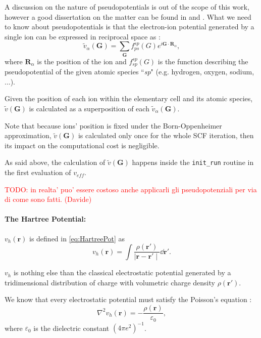 \documentclass[a4paper,12pt]{article}
\newcommand\mynotes[1]{\begin{flushright}

\textcolor{red}{TODO: #1}\end{flushright}}
\newcommand\mf[1]{\mathbf{#1}}
\newcommand\dens{\rho(\mathbf{r})}
\newcommand\erre{\mathbf{r}}
\newcommand\GI{\mathbf{G}}
\begin{document}
A discussion on the nature of pseudopotentials is out of the scope of this work, however a good dissertation on the matter can be found in \cite[chap. 11]{Martin} and \cite[p.90]{Marx}.
What we need to know about pseudopotentials is that the electron-ion potential generated by a single ion can be expressed in reciprocal space as :
\begin{equation}
	\tilde{v}_{\alpha}(\mf{G}) = \sum_{\mf{G}} f_{ps}^{sp}(G) e^{i \mf{G} \cdot \mf{R}_{\alpha}},
\end{equation}
where  $\mf{R}_{\alpha}$ is the position of the ion and $f_{sp}^{sp}(G)$ is the function describing the pseudopotential of the given atomic species ``\textit{sp}" (e.g. hydrogen, oxygen, sodium, ...).

Given the position of each ion within the elementary cell and its atomic species, $\tilde{v}(\mf{G})$ is calculated as a superposition of each $\tilde{v}_{\alpha}(\mf{G})$.

Note that because ions' position is fixed under the Born-Oppenheimer approximation, $\tilde{v}(\mf{G})$ is calculated only once for the whole SCF iteration, then its impact on the computational cost is negligible.  

As said above, the calculation of $\tilde{v}(\GI)$ happens inside the \texttt{init\_run} routine in the first evaluation of $v_{eff}$.

\mynotes{in realta' puo' essere costoso anche applicarli gli pseudopotenziali per via di come sono fatti. (Davide)}

\paragraph{The Hartree Potential:}

$v_{h}(\erre)$ is defined in \eqref{eq:HartreePot} as 
\begin{equation}
 v_{h}(\erre) = \int \frac{\rho(\mathbf{r'})}{\mid \mathbf{r} - \mathbf{r'} \mid}  \dd{\mathbf{r'}}.
\end{equation}

$v_{h}$ is nothing else than the classical electrostatic potential generated by a tridimensional distribution of charge with volumetric charge density $\rho(\erre')$.

We know that every electrostatic potential must satisfy the Poisson's equation :
\begin{equation}\label{eq:Poisson}
	\nabla^2 v_{h}(\erre) = - \frac{\dens}{\varepsilon_{0}},
\end{equation} 
where $\varepsilon_{0}$ is the dielectric constant $(4\pi e^2)^{-1}$.
\end{document}
